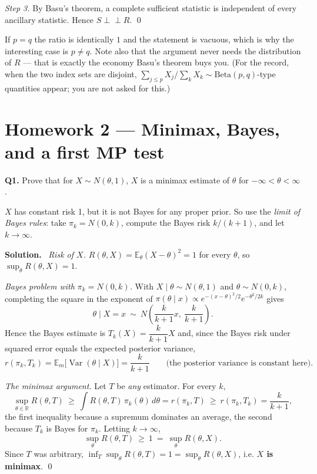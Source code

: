\documentclass[11pt]{article}
\newcommand{\E}{\mathbb{E}}
\newcommand{\Var}{\operatorname{Var}}
\newcommand{\R}{\mathbb{R}}
\newcommand{\ind}{\perp\!\!\!\perp}
\newenvironment{prob}[1]{\medskip\noindent\textbf{\large #1}\quad}{\par}
\newcommand{\soln}{\medskip\noindent\textbf{Solution.}\ }
\begin{document}
\emph{Step 3.} By Basu's theorem, a complete sufficient statistic is independent of every
ancillary statistic. Hence $S\ind R$. \qed

\begin{notebox}
If $p=q$ the ratio is identically $1$ and the statement is vacuous, which is why the
interesting case is $p\ne q$. Note also that the argument never needs the distribution of $R$
--- that is exactly the economy Basu's theorem buys you. (For the record, when the two index
sets are disjoint, $\sum_{j\le p}X_j/\sum_{k}X_k\sim\mathrm{Beta}(p,q)$-type quantities appear;
you are not asked for this.)
\end{notebox}

\newpage
\section{Homework 2 --- Minimax, Bayes, and a first MP test}

\begin{prob}{Q1.}
Prove that for $X\sim N(\theta,1)$, $X$ is a minimax estimate of $\theta$ for
$-\infty<\theta<\infty$.
\end{prob}

\begin{ideabox}
$X$ has constant risk 1, but it is not Bayes for any proper prior. So use the \emph{limit of
Bayes rules}: take $\pi_k=N(0,k)$, compute the Bayes risk $k/(k+1)$, and let $k\to\infty$.
\end{ideabox}

\soln
\emph{Risk of $X$.} $R(\theta,X)=\E_\theta(X-\theta)^2=1$ for every $\theta$, so
$\sup_\theta R(\theta,X)=1$.

\emph{Bayes problem with $\pi_k=N(0,k)$.} With $X\mid\theta\sim N(\theta,1)$ and
$\theta\sim N(0,k)$, completing the square in the exponent of
$\pi(\theta\mid x)\propto e^{-(x-\theta)^2/2}e^{-\theta^2/2k}$ gives
\[
\theta\mid X=x\ \sim\ N\!\left(\frac{k}{k+1}x,\ \frac{k}{k+1}\right).
\]
Hence the Bayes estimate is $T_k(X)=\dfrac{k}{k+1}X$ and, since the Bayes risk under squared
error equals the expected posterior variance,
\[
r(\pi_k,T_k)=\E_m\big[\Var(\theta\mid X)\big]=\frac{k}{k+1}
\qquad\text{(the posterior variance is constant here).}
\]

\emph{The minimax argument.} Let $T$ be \emph{any} estimator. For every $k$,
\[
\sup_{\theta\in\R}R(\theta,T)\ \ge\ \int R(\theta,T)\,\pi_k(\theta)\,d\theta=r(\pi_k,T)
\ \ge\ r(\pi_k,T_k)=\frac{k}{k+1},
\]
the first inequality because a supremum dominates an average, the second because $T_k$ is
Bayes for $\pi_k$. Letting $k\to\infty$,
\[
\sup_{\theta}R(\theta,T)\ \ge\ 1\ =\ \sup_\theta R(\theta,X).
\]
Since $T$ was arbitrary, $\inf_T\sup_\theta R(\theta,T)=1=\sup_\theta R(\theta,X)$, i.e.
\textbf{$X$ is minimax}. \qed
\end{document}

